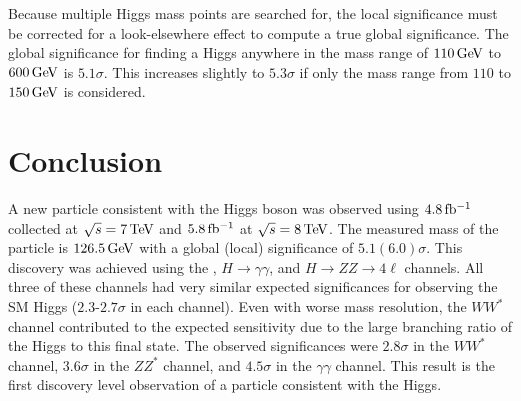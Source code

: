 \clearpage 

Because multiple Higgs mass points are searched for, the local significance must be corrected for a look-elsewhere effect to compute a true global significance. The global significance for finding a Higgs anywhere in the mass range of $110 \GeV$ to $600 \GeV$ is $5.1\sigma$. This increases slightly to $5.3\sigma$ if only the mass range from $110$ to $150 \GeV$ is considered. 

\section{Conclusion}

A new particle consistent with the Higgs boson was observed using $4.8 \mbox{\,fb$^{-1}$}$ collected at $\sqrt{s} = 7 \TeV$ and $5.8 \mbox{\,fb$^{-1}$}$ at $\sqrt{s} = 8 \TeV$. The measured mass of the particle is $126.5 \GeV$ with a global (local) significance of $5.1 (6.0)\sigma$. This discovery was achieved using the \HWWfull, $H\to\gamma\gamma$, and $H\to ZZ\to 4\ell$ channels. All three of these channels had very similar expected significances for observing the SM Higgs ($2.3$-$2.7\sigma$ in each channel). Even with worse mass resolution, the $WW^*$ channel contributed to the expected sensitivity due to the large branching ratio of the Higgs to this final state. The observed significances were $2.8\sigma$ in the $WW^*$ channel, $3.6\sigma$ in the $ZZ^*$ channel, and $4.5\sigma$ in the $\gamma\gamma$ channel. This result is the first discovery level observation of a particle consistent with the Higgs. 

